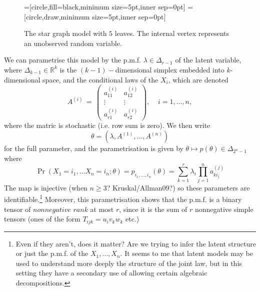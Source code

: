 \documentclass{article}
\theoremstyle{plain}
\theoremstyle{definition}
\theoremstyle{plain} %
\begin{document}
\begin{figure}[htp]
\centering
{}=[circle,fill=black,minimum size=5pt,inner sep=0pt]
=[circle,draw,minimum size=5pt,inner sep=0pt]
  \caption{The star graph model with $5$ leaves. The internal vertex represents an unobserved random variable.}\label{fig:star}
\end{figure}
We can parametrise this model by the p.m.f. $\lambda\in\Delta_{r-1}$ of the latent variable, where $\Delta_{k-1}\in\mathbb{R}^k$ is the $(k-1)-$dimensional simplex embedded into $k$-dimensional space, and the conditional laws of the $X_i$, which are denoted
$$ 
A^{(i)} \, = \, \left( \begin{array}{cc} a_{11}^{(i)} &  a_{12}^{(i)} \\[.3cm] \vdots & \vdots \\[.3cm] a_{r1}^{(i)} &  a_{r2}^{(i)} \end{array} \right), \;\;\;\; i=1,\ldots, n,
$$
where the matric is stochastic (i.e. row sum is zero). We then write $$\theta=(\lambda,A^{(1)},\dots,A^{(n)})$$ for the full parameter, and the parametrisation is given by
$\theta\mapsto p(\theta)\in\Delta_{2^n-1}$
where
\begin{equation}
    \Pr(X_1=i_1,\dots X_n=i_n;\theta)=p_{i_1,\dots,i_n}(\theta)=\sum_{k=1}^r\lambda_i\prod_{j=1}^na_{ki_j}^{(j)}
\end{equation}
The map is injective (when $n\geq 3$? Kruskal/Allman09?) so these parameters are identifiable.\footnote{Even if they aren't, does it matter? Are we trying to infer the latent structure or just the p.m.f. of the $X_1,\dots,X_n$. It seems to me that latent models may be used to understand more deeply the structure of the joint law, but in this setting they have a secondary use of allowing certain algebraic decompositions.} Moreover, this parametrisation shows that the p.m.f. is a binary tensor of $\textit{nonnegative rank}$ at most $r$, since it is the sum of $r$ nonnegative simple tensors (ones of the form $T_{ijk}=u_iv_kw_k$ etc.)
\end{document}
